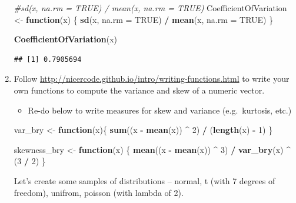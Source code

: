 \documentclass[]{book}
\newenvironment{Shaded}{\begin{snugshade}}{\end{snugshade}}
\newcommand{\CommentTok}[1]{\textcolor[rgb]{0.56,0.35,0.01}{\textit{#1}}}
\newcommand{\ControlFlowTok}[1]{\textcolor[rgb]{0.13,0.29,0.53}{\textbf{#1}}}
\newcommand{\DataTypeTok}[1]{\textcolor[rgb]{0.13,0.29,0.53}{#1}}
\newcommand{\DecValTok}[1]{\textcolor[rgb]{0.00,0.00,0.81}{#1}}
\newcommand{\KeywordTok}[1]{\textcolor[rgb]{0.13,0.29,0.53}{\textbf{#1}}}
\newcommand{\NormalTok}[1]{#1}
\newcommand{\OperatorTok}[1]{\textcolor[rgb]{0.81,0.36,0.00}{\textbf{#1}}}
\newcommand{\OtherTok}[1]{\textcolor[rgb]{0.56,0.35,0.01}{#1}}
\newcommand{\StringTok}[1]{\textcolor[rgb]{0.31,0.60,0.02}{#1}}
\providecommand{\tightlist}{%
  \setlength{\itemsep}{0pt}\setlength{\parskip}{0pt}}
\theoremstyle{definition}
\theoremstyle{definition}
\theoremstyle{definition}
\theoremstyle{remark}
\begin{document}
\begin{enumerate}
\begin{Shaded}
\begin{Highlighting}[]
\CommentTok{#sd(x, na.rm = TRUE) / mean(x, na.rm = TRUE)}
\NormalTok{CoefficientOfVariation <-}\StringTok{ }\ControlFlowTok{function}\NormalTok{(x) \{}
  \KeywordTok{sd}\NormalTok{(x, }\DataTypeTok{na.rm =} \OtherTok{TRUE}\NormalTok{) }\OperatorTok{/}\StringTok{ }\KeywordTok{mean}\NormalTok{(x, }\DataTypeTok{na.rm =} \OtherTok{TRUE}\NormalTok{)}
\NormalTok{\}}

\KeywordTok{CoefficientOfVariation}\NormalTok{(x)}
\end{Highlighting}
\end{Shaded}

\begin{verbatim}
## [1] 0.7905694
\end{verbatim}
\item
  Follow \url{http://nicercode.github.io/intro/writing-functions.html}
  to write your own functions to compute the variance and skew of a
  numeric vector.

  \begin{itemize}
  \tightlist
  \item
    Re-do below to write measures for skew and variance (e.g.~kurtosis,
    etc.)
  \end{itemize}

\begin{Shaded}
\begin{Highlighting}[]
\NormalTok{var_bry <-}\StringTok{ }\ControlFlowTok{function}\NormalTok{(x)\{}
  \KeywordTok{sum}\NormalTok{((x }\OperatorTok{-}\StringTok{ }\KeywordTok{mean}\NormalTok{(x)) }\OperatorTok{^}\StringTok{ }\DecValTok{2}\NormalTok{) }\OperatorTok{/}\StringTok{ }\NormalTok{(}\KeywordTok{length}\NormalTok{(x) }\OperatorTok{-}\StringTok{ }\DecValTok{1}\NormalTok{)}
\NormalTok{\}}

\NormalTok{skewness_bry <-}\StringTok{ }\ControlFlowTok{function}\NormalTok{(x) \{}
  \KeywordTok{mean}\NormalTok{((x }\OperatorTok{-}\StringTok{ }\KeywordTok{mean}\NormalTok{(x)) }\OperatorTok{^}\StringTok{ }\DecValTok{3}\NormalTok{) }\OperatorTok{/}\StringTok{ }\KeywordTok{var_bry}\NormalTok{(x) }\OperatorTok{^}\StringTok{ }\NormalTok{(}\DecValTok{3} \OperatorTok{/}\StringTok{ }\DecValTok{2}\NormalTok{)}
\NormalTok{\}}
\end{Highlighting}
\end{Shaded}

  Let's create some samples of distributions -- normal, t (with 7
  degrees of freedom), unifrom, poisson (with lambda of 2).


\end{enumerate}
\end{document}
